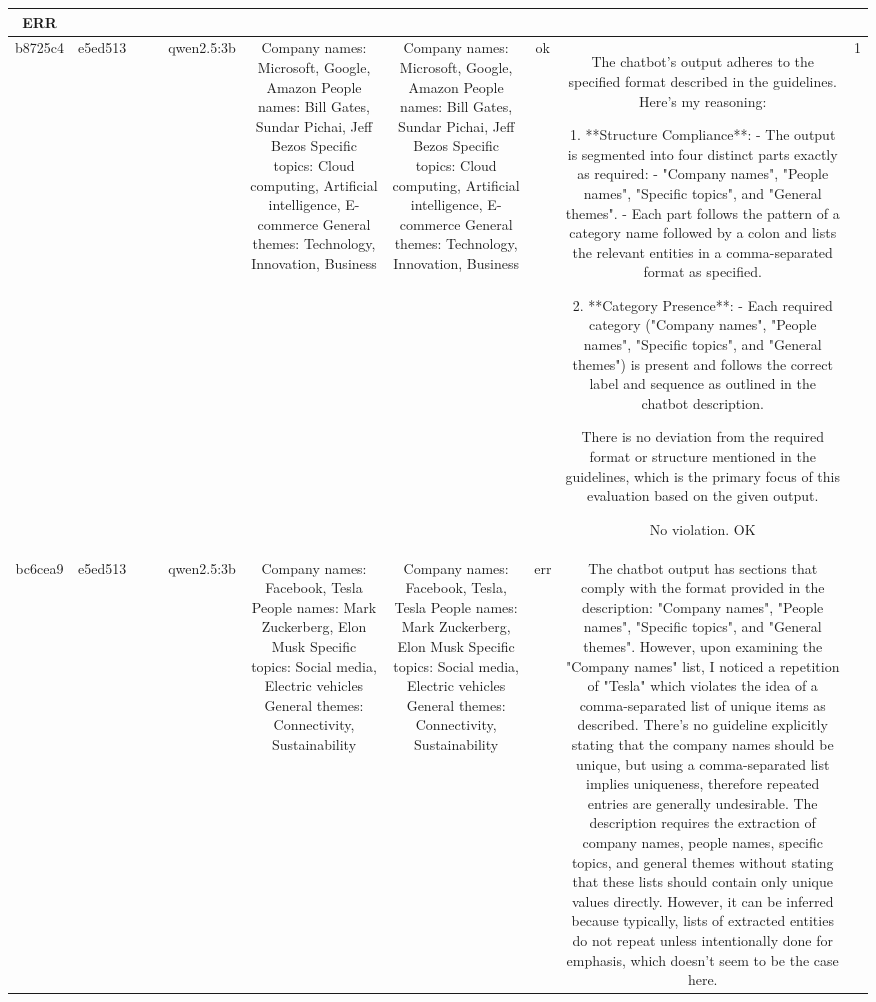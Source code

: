 \begin{table}[h!]
\begin{tabular}{|c|c|c|c|c|c|c|c|c|c|}
ERR & \\
\hline
b8725c4 & e5ed513 &  &  & qwen2.5:3b & Company names: Microsoft, Google, Amazon
People names: Bill Gates, Sundar Pichai, Jeff Bezos
Specific topics: Cloud computing, Artificial intelligence, E-commerce
General themes: Technology, Innovation, Business & Company names: Microsoft, Google, Amazon
People names: Bill Gates, Sundar Pichai, Jeff Bezos
Specific topics: Cloud computing, Artificial intelligence, E-commerce
General themes: Technology, Innovation, Business & ok & The chatbot's output adheres to the specified format described in the guidelines. Here's my reasoning:

1. **Structure Compliance**: 
   - The output is segmented into four distinct parts exactly as required: 
     - "Company names", "People names", "Specific topics", and "General themes".
   - Each part follows the pattern of a category name followed by a colon and lists the relevant entities in a comma-separated format as specified.

2. **Category Presence**:
   - Each required category ("Company names", "People names", "Specific topics", and "General themes") is present and follows the correct label and sequence as outlined in the chatbot description.

There is no deviation from the required format or structure mentioned in the guidelines, which is the primary focus of this evaluation based on the given output.

No violation.
OK & 1\\
\hline
bc6cea9 & e5ed513 &  &  & qwen2.5:3b & Company names: Facebook, Tesla
People names: Mark Zuckerberg, Elon Musk
Specific topics: Social media, Electric vehicles
General themes: Connectivity, Sustainability & Company names: Facebook, Tesla, Tesla
People names: Mark Zuckerberg, Elon Musk
Specific topics: Social media, Electric vehicles
General themes: Connectivity, Sustainability & err & The chatbot output has sections that comply with the format provided in the description: "Company names", "People names", "Specific topics", and "General themes". However, upon examining the "Company names" list, I noticed a repetition of "Tesla" which violates the idea of a comma-separated list of unique items as described. There's no guideline explicitly stating that the company names should be unique, but using a comma-separated list implies uniqueness, therefore repeated entries are generally undesirable. The description requires the extraction of company names, people names, specific topics, and general themes without stating that these lists should contain only unique values directly. However, it can be inferred because typically, lists of extracted entities do not repeat unless intentionally done for emphasis, which doesn't seem to be the case here.


\end{tabular}
\end{table}
